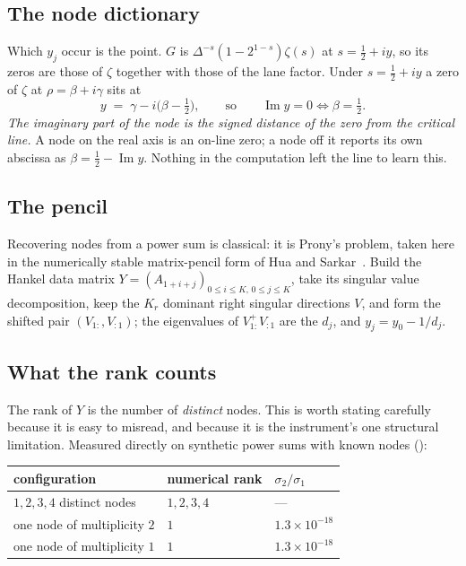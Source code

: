 \documentclass[11pt]{article}
\theoremstyle{plain}
\theoremstyle{definition}
\theoremstyle{remark}
\newcommand{\lean}[1]{\texttt{\detokenize{#1}}}
\begin{document}
\subsection{The node dictionary}
Which $y_j$ occur is the point. $G$ is $\Delta^{-s}(1-2^{1-s})\zeta(s)$ at
$s=\tfrac12+iy$, so its zeros are those of $\zeta$ together with those of the lane
factor. Under $s=\tfrac12+iy$ a zero of $\zeta$ at $\rho=\beta+i\gamma$ sits at
\begin{equation}\label{eq:dict}
  y\;=\;\gamma-i\bigl(\beta-\tfrac12\bigr),
  \qquad\text{so}\qquad
  \operatorname{Im}y=0\iff\beta=\tfrac12 .
\end{equation}
\emph{The imaginary part of the node is the signed distance of the zero from the
critical line.} A node on the real axis is an on-line zero; a node off it reports its
own abscissa as $\beta=\tfrac12-\operatorname{Im}y$. Nothing in the computation left the
line to learn this.

\subsection{The pencil}
Recovering nodes from a power sum is classical: it is Prony's problem, taken here in
the numerically stable matrix-pencil form of Hua and Sarkar~\cite{HuaSarkar1990}.
Build the Hankel data matrix
$Y=(A_{1+i+j})_{0\le i\le K,\,0\le j\le K}$, take its singular value decomposition,
keep the $K_r$ dominant right singular directions $V$, and form the shifted pair
$(V_{1:},V_{:1})$; the eigenvalues of $V_{1:}^{+}V_{:1}$ are the $d_j$, and
$y_j=y_0-1/d_j$.

\subsection{What the rank counts}
The rank of $Y$ is the number of \emph{distinct} nodes. This is worth stating carefully
because it is easy to misread, and because it is the instrument's one structural
limitation. Measured directly on synthetic power sums with known nodes
(\lean{extractor/checks/rank_drop.py}):

\begin{center}
\begin{tabular}{lll}
\toprule
configuration & numerical rank & $\sigma_2/\sigma_1$\\
\midrule
$1,2,3,4$ distinct nodes & $1,2,3,4$ & --- \\
one node of multiplicity $2$ & $1$ & $1.3\times10^{-18}$\\
one node of multiplicity $1$ & $1$ & $1.3\times10^{-18}$\\
\bottomrule
\end{tabular}
\end{center}
\end{document}
